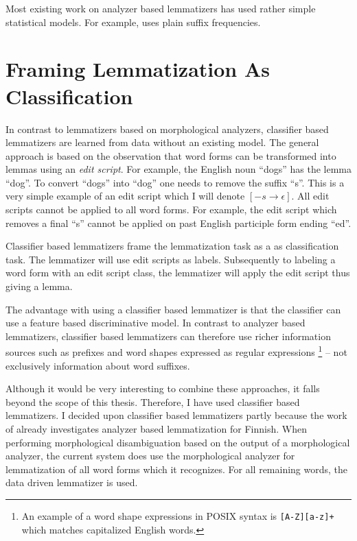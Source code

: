 Most existing work on analyzer based lemmatizers has used rather
simple statistical models. For example, \cite{Linden2009} uses plain
suffix frequencies. 

\section{Framing Lemmatization As Classification}

In contrast to lemmatizers based on morphological analyzers,
classifier based lemmatizers \cite{Chrupala2008} are learned from data
without an existing model. The general approach is based on the
observation that word forms can be transformed into lemmas using an
{\it edit script}. For example, the English noun ``dogs'' has the
lemma ``dog''. To convert ``dogs'' into ``dog'' one needs to remove
the suffix ``s''. This is a very simple example of an edit script
which I will denote $[-s \rightarrow \epsilon]$. All edit scripts
cannot be applied to all word forms. For example, the edit script which
removes a final ``s'' cannot be applied on past English participle
form ending ``ed''.

Classifier based lemmatizers frame the lemmatization task as a as
classification task. The lemmatizer will use edit scripts as
labels. Subsequently to labeling a word form with an edit script
class, the lemmatizer will apply the edit script thus giving a lemma.

The advantage with using a classifier based lemmatizer is that the
classifier can use a feature based discriminative model. In contrast
to analyzer based lemmatizers, classifier based lemmatizers can
therefore use richer information sources such as prefixes and word
shapes expressed as regular expressions \footnote{An example of a word
  shape expressions in POSIX syntax is {\tt [A-Z][a-z]+} which matches
  capitalized English words.} -- not exclusively information about
word suffixes.

Although it would be very interesting to combine these approaches, it
falls beyond the scope of this thesis. Therefore, I have used
classifier based lemmatizers. I decided upon classifier based
lemmatizers partly because the work of \cite{Linden2009} already
investigates analyzer based lemmatization for Finnish. When performing
morphological disambiguation based on the output of a morphological
analyzer, the current system does use the morphological analyzer for
lemmatization of all word forms which it recognizes. For all remaining
words, the data driven lemmatizer is used.

